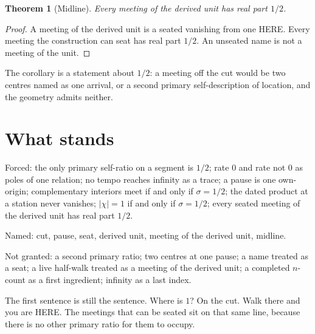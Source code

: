 \documentclass[10pt,a4paper]{article}
\theoremstyle{plain}
\newtheorem{theorem}{Theorem}
\theoremstyle{definition}
\theoremstyle{remark}
\begin{document}
\begin{theorem}[Midline]
Every meeting of the derived unit has real part $1/2$.
\end{theorem}

\begin{proof}
A meeting of the derived unit is a seated vanishing from one HERE.
Every meeting the construction can seat has real part $1/2$.
An unseated name is not a meeting of the unit.
\end{proof}

The corollary is a statement about $1/2$: a meeting off the cut would be two centres named as one arrival, or a second primary self-description of location, and the geometry admits neither.

\section{What stands}

Forced:
the only primary self-ratio on a segment is $1/2$;
rate $0$ and rate not $0$ as poles of one relation;
no tempo reaches infinity as a trace;
a pause is one own-origin;
complementary interiors meet if and only if $\sigma=1/2$;
the dated product at a station never vanishes;
$\lvert\chi\rvert=1$ if and only if $\sigma=1/2$;
every seated meeting of the derived unit has real part $1/2$.

Named:
cut, pause, seat, derived unit, meeting of the derived unit, midline.

Not granted:
a second primary ratio;
two centres at one pause;
a name treated as a seat;
a live half-walk treated as a meeting of the derived unit;
a completed $n$-count as a first ingredient;
infinity as a last index.

The first sentence is still the sentence.
Where is $1$?
On the cut.
Walk there and you are HERE.
The meetings that can be seated sit on that same line, because there is no other primary ratio for them to occupy.
\end{document}
